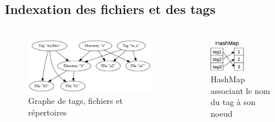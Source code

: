 \documentclass[10pt]{beamer}
\begin{document}
\subsection{Indexation des fichiers et des tags}
\begin{frame}
    \frametitle{\subsecname}
    \begin{columns}[T]
        \pause
        \begin{column}{.6\textwidth}
            \begin{figure}
                \begin{center}
                    \includegraphics[width=1\textwidth]{images/graph.png}
                    \caption{Graphe de tags, fichiers et répertoires}
                \end{center}
            \end{figure}
        \end{column}
        \pause
        \begin{column}{.4\textwidth}
            \begin{figure}
                \begin{center}
                    \includegraphics[width=0.5\textwidth]{images/hashmap.png}
                    \caption{HashMap associant le nom du tag à son noeud}
                \end{center}
            \end{figure}
        \end{column}
    \end{columns}
\end{frame}
\end{document}
